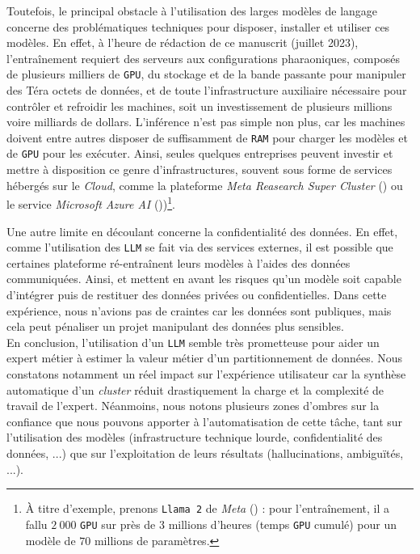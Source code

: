 			Toutefois, le principal obstacle à l'utilisation des larges modèles de langage concerne des problématiques techniques pour disposer, installer et utiliser ces modèles.
			En effet, à l'heure de rédaction de ce manuscrit (juillet 2023), l'entraînement requiert des serveurs aux configurations pharaoniques, composés de plusieurs milliers de \texttt{GPU}, du stockage et de la bande passante pour manipuler des Téra octets de données, et de toute l'infrastructure auxiliaire nécessaire pour contrôler et refroidir les machines, soit un investissement de plusieurs millions voire milliards de dollars.
			L'inférence n'est pas simple non plus, car les machines doivent entre autres disposer de suffisamment de \texttt{RAM} pour charger les modèles et de \texttt{GPU} pour les exécuter.
			Ainsi, seules quelques entreprises peuvent investir et mettre à disposition ce genre d'infrastructures, souvent sous forme de services hébergés sur le \textit{Cloud}, comme la plateforme \textit{Meta Reasearch Super Cluster} (\cite{lee-sengupta:2022:introducing-ai-research}) ou le service \textit{Microsoft Azure AI} (\cite{roach:2023:how-microsoft-bet}))\footnote{
				À titre d'exemple, prenons \texttt{Llama 2} de \textit{Meta} (\cite{touvron-etal:2023:llama-open-foundation}) : pour l'entraînement, il a fallu $2~000$ \texttt{GPU} sur près de $3$ millions d'heures (temps \texttt{GPU} cumulé) pour un modèle de $70$ millions de paramètres.
			}.
			
			Une autre limite en découlant concerne la confidentialité des données.
			En effet, comme l'utilisation des \texttt{LLM} se fait via des services externes, il est possible que certaines plateforme ré-entraînent leurs modèles à l'aides des données communiquées.
			Ainsi, \cite{huang-etal:2022:are-large-pretrained} et \cite{oneill-connor:2023:amplifying-limitations-harms} mettent en avant les risques qu'un modèle soit capable d'intégrer puis de restituer des données privées ou confidentielles.
			Dans cette expérience, nous n'avions pas de craintes car les données sont publiques, mais cela peut pénaliser un projet manipulant des données plus sensibles.
			\\
			
			En conclusion, l'utilisation d'un \texttt{LLM} semble très prometteuse pour aider un expert métier à estimer la valeur métier d'un partitionnement de données.
			Nous constatons notamment un réel impact sur l'expérience utilisateur car la synthèse automatique d'un \textit{cluster} réduit drastiquement la charge et la complexité de travail de l'expert.
			Néanmoins, nous notons plusieurs zones d'ombres sur la confiance que nous pouvons apporter à l'automatisation de cette tâche, tant sur l'utilisation des modèles (infrastructure technique lourde, confidentialité des données, ...) que sur l'exploitation de leurs résultats (hallucinations, ambiguïtés, ...).
		
